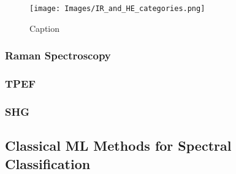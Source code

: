 




\begin{figure}[htbp] 
    \centering 
    \texttt{[image: Images/IR\_and\_HE\_categories.png]} 
    \caption{Caption} \label{fig:my-label} 
\end{figure}

\subsubsection{Raman Spectroscopy}
\subsubsection{TPEF}
\subsubsection{SHG}

\subsection{Classical ML Methods for Spectral Classification}

